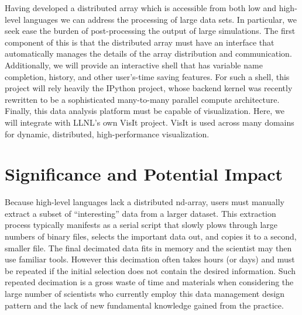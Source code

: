 \documentclass[letterpaper,11pt]{article}
\begin{document}
Having developed a distributed array which is accessible from both low and high-level 
languages we can address the processing of large data sets.  In particular, we seek 
ease the burden of post-processing the output of large simulations. 
The first component of this is that the distributed array must have an interface that 
automatically manages the details of the array distribution and communication.  
Additionally, we will provide an interactive shell that has variable name completion, 
history, and other user's-time saving features.  For such a shell, this project will 
rely heavily the IPython project, whose backend kernel was recently rewritten to be a 
sophisticated many-to-many parallel compute architecture.  Finally, this data analysis 
platform must be capable of visualization.  Here, we will integrate with LLNL's own VisIt 
project.  VisIt is used across many domains for dynamic, distributed, 
high-performance visualization.





\section*{Significance and Potential Impact}

Because high-level languages lack a distributed nd-array, users must manually extract a subset
 of ``interesting'' data from a larger dataset.  This extraction process typically manifests 
as a serial script that slowly plows through large numbers of binary files, selects the 
important data out, and copies it to a second, smaller file.  The final decimated data fits 
in memory and the scientist may then use familiar tools.   However this decimation often takes 
hours (or days) and must be repeated if the initial selection does not contain the desired 
information.  Such repeated decimation is a gross waste of time and materials when considering 
the large number of scientists who currently employ this data management design pattern and
the lack of new fundamental knowledge gained from the practice.
\end{document}
